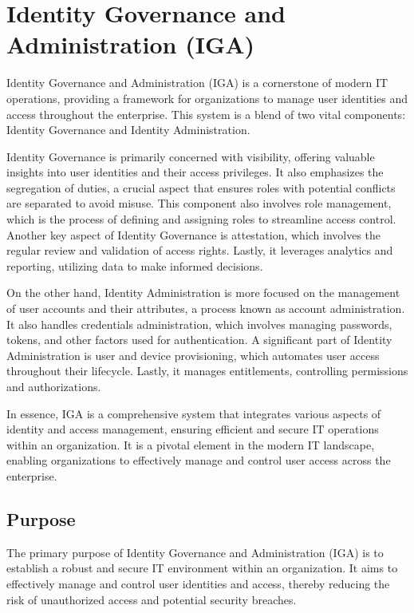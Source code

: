 \section{Identity Governance and Administration (IGA)}
\label{sec:IGA}

Identity Governance and Administration (IGA) is a cornerstone of modern IT operations, providing a framework for organizations to manage user identities and access throughout the enterprise. This system is a blend of two vital components: Identity Governance and Identity Administration.

Identity Governance is primarily concerned with visibility, offering valuable insights into user identities and their access privileges. It also emphasizes the segregation of duties, a crucial aspect that ensures roles with potential conflicts are separated to avoid misuse. This component also involves role management, which is the process of defining and assigning roles to streamline access control. Another key aspect of Identity Governance is attestation, which involves the regular review and validation of access rights. Lastly, it leverages analytics and reporting, utilizing data to make informed decisions.

On the other hand, Identity Administration is more focused on the management of user accounts and their attributes, a process known as account administration. It also handles credentials administration, which involves managing passwords, tokens, and other factors used for authentication. A significant part of Identity Administration is user and device provisioning, which automates user access throughout their lifecycle. Lastly, it manages entitlements, controlling permissions and authorizations.

In essence, IGA is a comprehensive system that integrates various aspects of identity and access management, ensuring efficient and secure IT operations within an organization. It is a pivotal element in the modern IT landscape, enabling organizations to effectively manage and control user access across the enterprise.


\subsection{Purpose}


The primary purpose of Identity Governance and Administration (IGA) is to establish a robust and secure IT environment within an organization. It aims to effectively manage and control user identities and access, thereby reducing the risk of unauthorized access and potential security breaches.

